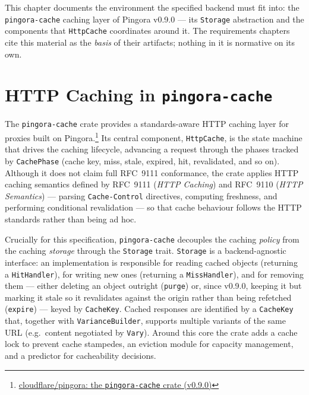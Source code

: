 %

This chapter documents the environment the specified backend must fit into: the
\texttt{pingora-cache} caching layer of Pingora v0.9.0 --- its \texttt{Storage}
abstraction and the components that \texttt{HttpCache} coordinates around it.
The requirements chapters cite this material as the \emph{basis} of their
artifacts; nothing in it is normative on its own.

\section{HTTP Caching in \texttt{pingora-cache}}

The \texttt{pingora-cache} crate provides a standards-aware HTTP caching layer
for proxies built on Pingora.\footnote{\href{https://github.com/cloudflare/pingora/tree/0.9.0/pingora-cache}{cloudflare/pingora: the \texttt{pingora-cache} crate (v0.9.0)}}
Its central component, \texttt{HttpCache}, is the state machine that drives
the caching lifecycle, advancing a request through the phases tracked by
\texttt{CachePhase} (cache key, miss, stale, expired, hit, revalidated, and so on).
Although it does not claim full RFC~9111 conformance, the crate applies HTTP
caching semantics defined by RFC~9111 (\emph{HTTP Caching}) and RFC~9110
(\emph{HTTP Semantics}) --- parsing \texttt{Cache-Control} directives,
computing freshness, and performing conditional revalidation --- so that cache
behaviour follows the HTTP standards rather than being ad hoc.

Crucially for this specification, \texttt{pingora-cache} decouples the caching
\emph{policy} from the caching \emph{storage} through the \texttt{Storage}
trait. \texttt{Storage} is a backend-agnostic interface: an implementation is
responsible for reading cached objects (returning a \texttt{HitHandler}), for
writing new ones (returning a \texttt{MissHandler}), and for removing them ---
either deleting an object outright (\texttt{purge}) or, since v0.9.0, keeping it
but marking it stale so it revalidates against the origin rather than being
refetched (\texttt{expire}) --- keyed by \texttt{CacheKey}. Cached responses are identified by a \texttt{CacheKey} that,
together with \texttt{VarianceBuilder}, supports multiple variants of the same
URL (e.g.\ content negotiated by \texttt{Vary}). Around this core the crate
adds a cache lock to prevent cache stampedes, an eviction module for capacity
management, and a predictor for cacheability decisions.

